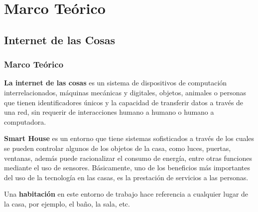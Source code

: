 \section{Marco Teórico}

\begin{frame}
\subsection{Internet de las Cosas}
\frametitle{Marco Teórico}

\small
\textbf{La internet de las cosas} es un sistema de dispositivos de computación interrelacionados, máquinas mecánicas y digitales, objetos, animales o personas que tienen identificadores únicos y la capacidad de transferir datos a través de una red, sin requerir de interacciones humano a humano o humano a computadora. \newline

\textbf{Smart House} es un entorno que tiene sistemas sofisticados a través de los cuales se pueden controlar algunos de los objetos de la casa, como luces, puertas, ventanas, además puede racionalizar el consumo de energía, entre otras funciones mediante el uso de sensores. Básicamente, uno de los beneficios más importantes del uso de la tecnología en las casas, es la prestación de servicios a las personas.\cite{Howedi2016}\newline

Una \textbf{habitación} en este entorno de trabajo hace referencia a cualquier lugar de la casa, por ejemplo, el baño, la sala, etc.
\end{frame}